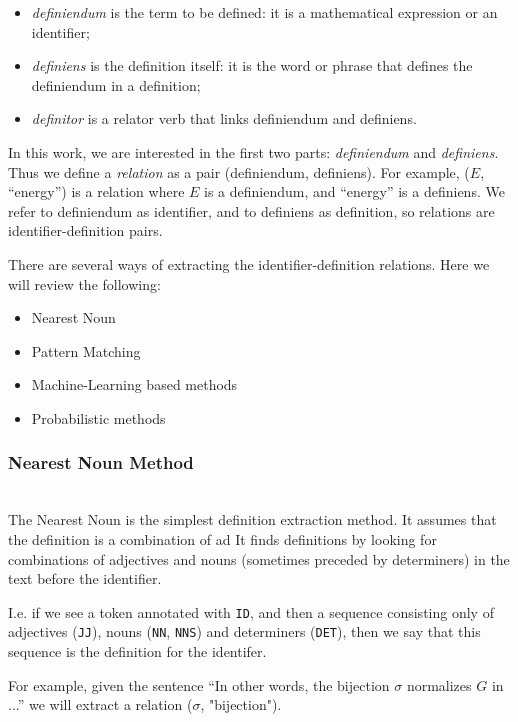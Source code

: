 \begin{itemize}
\itemsep1pt\parskip0pt
  \item \emph{definiendum} is the term to be defined: it is a mathematical expression
      or an identifier;
  \item \emph{definiens} is the definition itself: it is the word or phrase that defines the definiendum in a definition;
  \item \emph{definitor} is a relator verb that links definiendum and definiens.
\end{itemize}

In this work, we are interested in the first two parts: \emph{definiendum} and
\emph{definiens}. Thus we define a \emph{relation} as a pair
(definiendum, definiens). For example, ($E$, ``energy'') is a relation where
$E$ is a definiendum, and ``energy'' is a definiens. We refer to definiendum as
identifier, and to definiens as definition, so relations are identifier-definition
pairs.

There are several ways of extracting the identifier-definition relations.
Here we will review the following:

\begin{itemize}
\itemsep1pt\parskip0pt
  \item Nearest Noun
  \item Pattern Matching
  \item Machine-Learning based methods
  \item Probabilistic methods
\end{itemize}


\subsubsection{Nearest Noun Method} \ \\

The Nearest Noun  \cite{grigore2009towards} \cite{yokoi2011contextual}
is the simplest definition extraction method.
It assumes that the definition is a combination of ad
It finds definitions by looking for combinations of adjectives and nouns
(sometimes preceded by determiners) in the text before the identifier.

I.e. if we see a token annotated with \texttt{ID}, and then a sequence
consisting only of adjectives (\texttt{JJ}), nouns (\texttt{NN}, \texttt{NNS})
and determiners (\texttt{DET}), then we say that this sequence is
the definition for the identifer.

For example, given the sentence ``In other words, the bijection $\sigma$ normalizes
$G$ in ...'' we will extract a relation ($\sigma$, "bijection").



